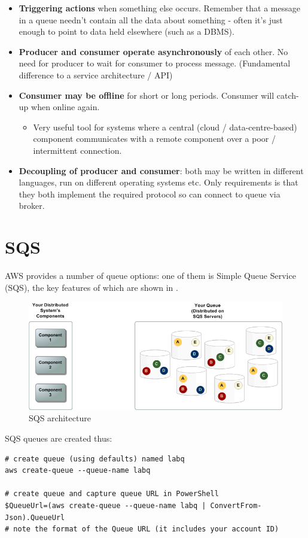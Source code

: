 \begin{itemize}
\item
  \textbf{Triggering actions} when something else occurs. Remember that
  a message in a queue needn't contain all the data about something -
  often it's just enough to point to data held elsewhere (such as a
  DBMS).
\item
  \textbf{Producer and consumer operate asynchronously} of each other.
  No need for producer to wait for consumer to process message.
  (Fundamental difference to a service architecture / API)
\item
  \textbf{Consumer may be offline} for short or long periods. Consumer
  will catch-up when online again.

  \begin{itemize}
  
  \item
    Very useful tool for systems where a central (cloud /
    data-centre-based) component communicates with a remote component
    over a poor / intermittent connection.
  \end{itemize}
\item
  \textbf{Decoupling of producer and consumer}: both may be written in
  different languages, run on different operating systems etc. Only
  requirements is that they both implement the required protocol so can
  connect to queue via broker.
\end{itemize}

\section{SQS}\label{sqs}

AWS provides a number of queue options: one of them is Simple Queue
Service (SQS), the key features of which are shown in .

\begin{figure}
\centering
\includegraphics[width=0.6\linewidth]{sqs_architecture}
\caption{SQS architecture{}}
\end{figure}

SQS queues are created thus:

\begin{verbatim}
# create queue (using defaults) named labq
aws create-queue --queue-name labq

# create queue and capture queue URL in PowerShell
$QueueUrl=(aws create-queue --queue-name labq | ConvertFrom-Json).QueueUrl
# note the format of the Queue URL (it includes your account ID)
\end{verbatim}

